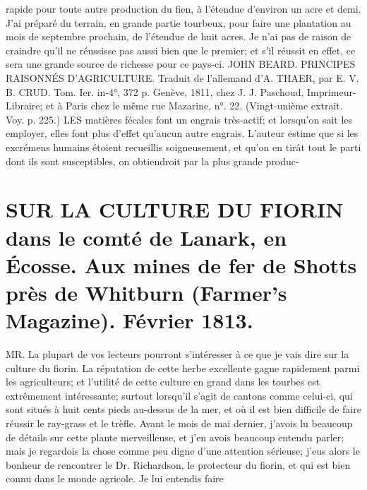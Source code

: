 \setcounter{page}{293} rapide pour toute autre production du fien, à l'étendue d'environ un acre et demi. J'ai préparé du terrain, en grande partie tourbeux, pour faire une plantation au mois de septembre prochain, de l'étendue de huit acres. Je n'ai pas de raison de craindre qu'il ne réussisse pas aussi bien que le premier; et s'il réussit en effet, ce sera une grande source de richesse pour ce pays-ci.
JOHN BEARD.
PRINCIPES RAISONNÉS D'AGRICULTURE. Traduit de l'allemand d'A. THAER, par E. V. B. CRUD. Tom. Ier. in-4°, 372 p. Genève, 1811, chez J. J. Paschoud, Imprimeur-Libraire; et à Paris chez le même rue Mazarine, n°. 22. (Vingt-unième extrait. Voy. p. 225.)
LES matières fécales font un engrais très-actif; et lorsqu'on sait les employer, elles font plus d'effet qu'aucun autre engrais. L'auteur estime que si les excrémens humains étoient recueillis soigneusement, et qu'on en tirât tout le parti dont ils sont susceptibles, on obtiendroit par la plus grande produc-\setcounter{page}{294} \section{SUR LA CULTURE DU FIORIN dans le comté de Lanark, en Écosse. Aux mines de fer de Shotts près de Whitburn (Farmer's Magazine). Février 1813.}
MR.
La plupart de vos lecteurs pourront s'intéresser à ce que je vais dire sur la culture du fiorin. La réputation de cette herbe excellente gagne rapidement parmi les agriculteurs; et l'utilité de cette culture en grand dans les tourbes est extrêmement intéressante; surtout lorsqu'il s'agit de cantons comme celui-ci, qui sont situés à huit cents pieds au-dessus de la mer, et où il est bien difficile de faire réussir le ray-grass et le trèfle.
Avant le mois de mai dernier, j'avois lu beaucoup de détails sur cette plante merveilleuse, et j'en avois beaucoup entendu parler; mais je regardois la chose comme peu digne d'une attention sérieuse; j'eus alors le bonheur de rencontrer le Dr. Richardson, le protecteur du fiorin, et qui est bien connu dans le monde agricole. Je lui entendis faire
